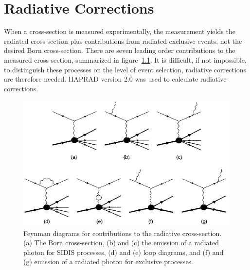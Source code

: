 \chapter{Radiative Corrections}
\label{cha:RadiativeCorrections}
%
When a cross-section is measured experimentally, the measurement yields the radiated cross-section plus contributions from radiated exclusive events, not the desired Born cross-section.
There are seven leading order contributions to the measured cross-section, summarized in figure~\ref{fig:radiatedFeynmanDiagrams}.
It is difficult, if not impossible, to distinguish these processes on the level of event selection, radiative corrections are therefore needed.
HAPRAD version 2.0 \cite{Akushevich99}\cite{Akushevich09} was used to calculate radiative corrections.
%
\begin{figure}[htp]
\centering
\includegraphics[width=5in]{figures/radiatedFeynmanDiagrams_BandW.png}
\caption{Feynman diagrams for contributions to the radiative cross-section. (a) The Born cross-section, (b) and (c) the emission of a radiated photon for SIDIS processes, (d) and (e) loop diagrams, and (f) and (g) emission of a radiated photon for exclusive processes.}
\label{fig:radiatedFeynmanDiagrams}
\end{figure}

